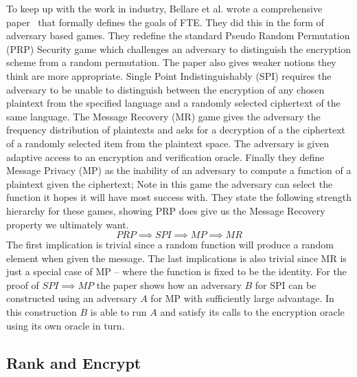 \documentclass[ %
                    author={Samuel Russell},
                supervisor={Prof. Bogdan Warinschi},
                    degree={MEng},
                     title={Innocuous Ciphertexts},
                  subtitle={The DE-CENSOR Scheme},
                      type={research},
                      year={2018} ]{dissertation}
\begin{document}
To keep up with the work in industry, Bellare et al. wrote a comprehensive paper~\cite{fpe} that formally defines the goals of FTE. They did this in the form of adversary based games. They redefine the standard Pseudo Random Permutation (PRP) Security game which challenges an adversary to distinguish the encryption scheme from a random permutation. The paper also gives weaker notions they think are more appropriate. Single Point Indistinguishably (SPI) requires the adversary to be unable to distinguish between the encryption of any chosen plaintext from the specified language and a randomly selected ciphertext of the same language. The Message Recovery (MR) game gives the adversary the frequency distribution of plaintexts and asks for a decryption of a the ciphertext of a randomly selected item from the plaintext space. The adversary is given adaptive access to an encryption and verification oracle. Finally they define Message Privacy (MP) as the inability of an adversary to compute a function of a plaintext given the ciphertext; Note in this game the adversary can select the function it hopes it will have most success with. They state the following strength hierarchy for these games, showing PRP does give us the Message Recovery property we ultimately want.
$$ PRP \implies SPI \implies MP \implies MR $$
The first implication is trivial since a random function will produce a random element when given the message. The last implications is also trivial since MR is just a special case of MP -- where the function is fixed to be the identity. For the proof of $ SPI \implies MP $ the paper shows how an adversary $B$ for SPI can be constructed using an adversary $A$ for MP with sufficiently large advantage. In this construction $B$ is able to run $A$ and satisfy its calls to the encryption oracle using its own oracle in turn.

\subsection{Rank and Encrypt}
\end{document}
